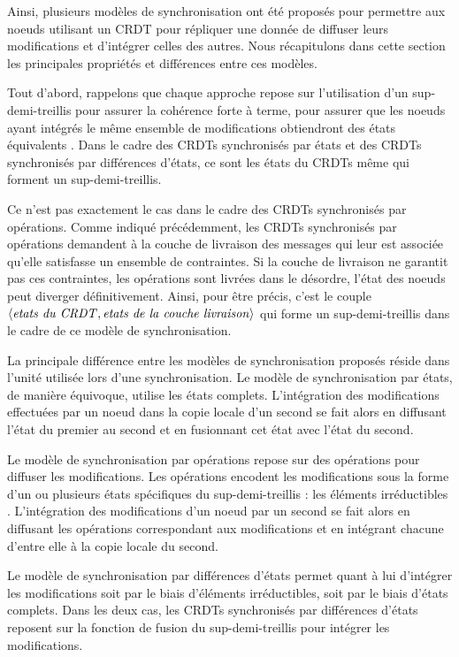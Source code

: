 \label{def:synchro-synthese}

Ainsi, plusieurs modèles de synchronisation ont été proposés pour permettre aux noeuds utilisant un \ac{CRDT} pour répliquer une donnée de diffuser leurs modifications et d'intégrer celles des autres.
Nous récapitulons dans cette section les principales propriétés et différences entre ces modèles.

Tout d'abord, rappelons que chaque approche repose sur l'utilisation d'un sup-demi-treillis pour assurer la cohérence forte à terme, \ie pour assurer que les noeuds ayant intégrés le même ensemble de modifications obtiendront des états équivalents .
Dans le cadre des \acp{CRDT} synchronisés par états et des \acp{CRDT} synchronisés par différences d'états, ce sont les états du \acp{CRDT} même qui forment un sup-demi-treillis.

Ce n'est pas exactement le cas dans le cadre des \acp{CRDT} synchronisés par opérations.
Comme indiqué précédemment, les \acp{CRDT} synchronisés par opérations demandent à la couche de livraison des messages qui leur est associée qu'elle satisfasse un ensemble de contraintes.
Si la couche de livraison ne garantit pas ces contraintes, \eg les opérations sont livrées dans le désordre, l'état des noeuds peut diverger définitivement.
Ainsi, pour être précis, c'est le couple $\langle \mathit{etats~du~CRDT},\mathit{etats~de~la~couche~livraison} \rangle$ qui forme un sup-demi-treillis dans le cadre de ce modèle de synchronisation.

La principale différence entre les modèles de synchronisation proposés réside dans l'unité utilisée lors d'une synchronisation.
Le modèle de synchronisation par états, de manière équivoque, utilise les états complets.
L'intégration des modifications effectuées par un noeud dans la copie locale d'un second se fait alors en diffusant l'état du premier au second et en fusionnant cet état avec l'état du second.

Le modèle de synchronisation par opérations repose sur des opérations pour diffuser les modifications.
Les opérations encodent les modifications sous la forme  d'un ou plusieurs états spécifiques du sup-demi-treillis : les éléments irréductibles .
L'intégration des modifications d'un noeud par un second se fait alors en diffusant les opérations correspondant aux modifications et en intégrant chacune d'entre elle à la copie locale du second.

Le modèle de synchronisation par différences d'états permet quant à lui d'intégrer les modifications soit par le biais d'éléments irréductibles, soit par le biais d'états complets.
Dans les deux cas, les \acp{CRDT} synchronisés par différences d'états reposent sur la fonction de fusion du sup-demi-treillis pour intégrer les modifications.

